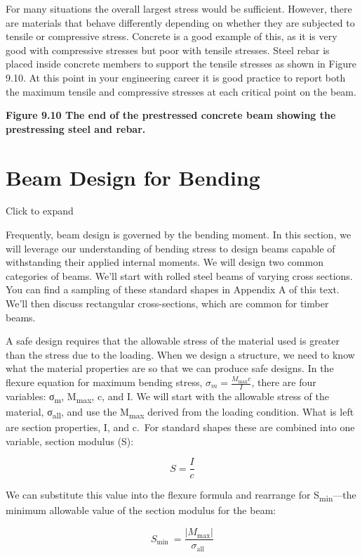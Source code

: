 \documentclass[
  letterpaper,
  DIV=11,
  numbers=noendperiod]{scrreprt}
\begin{document}
For many situations the overall largest stress would be sufficient.
However, there are materials that behave differently depending on
whether they are subjected to tensile or compressive stress. Concrete is
a good example of this, as it is very good with compressive stresses but
poor with tensile stresses. Steel rebar is placed inside concrete
members to support the tensile stresses as shown in Figure 9.10. At this
point in your engineering career it is good practice to report both the
maximum tensile and compressive stresses at each critical point on the
beam.

\textbf{Figure 9.10 The end of the prestressed concrete beam showing the
prestressing steel and rebar.}

\section{Beam Design for Bending}\label{beam-design-for-bending}

Click to expand

Frequently, beam design is governed by the bending moment. In this
section, we will leverage our understanding of bending stress to design
beams capable of withstanding their applied internal moments. We will
design two common categories of beams. We'll start with rolled steel
beams of varying cross sections. You can find a sampling of these
standard shapes in Appendix A of this text. We'll then discuss
rectangular cross-sections, which are common for timber beams.

A safe design requires that the allowable stress of the material used is
greater than the stress due to the loading. When we design a structure,
we need to know what the material properties are so that we can produce
safe designs. In the flexure equation for maximum bending stress,
\(\sigma_m=\frac{M_{\max } c}{I}\), there are four variables:
σ\textsubscript{m}, M\textsubscript{max}, c, and I. We will start with
the allowable stress of the material, σ\textsubscript{all}, and use the
\textbar M\textsubscript{max}\textbar{} derived from the loading
condition. What is left are section properties, I, and c.~For standard
shapes these are combined into one variable, section modulus (S):

\[
S=\frac{I}{c}
\]

We can substitute this value into the flexure formula and rearrange for
S\textsubscript{min}---the minimum allowable value of the section
modulus for the beam:

\[
S_{\text {min }}=\frac{\left|M_{\max }\right|}{\sigma_{\text {all }}}
\]
\end{document}
